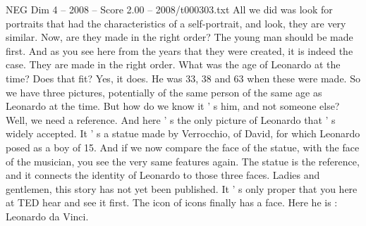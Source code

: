 \begin{textsample}{NEG Dim 4 – 2008 – Score 2.00 – 2008/t000303.txt}
All we did was look for portraits that had the characteristics of a self-portrait, and look, they are very similar.
Now, are they made in the right order?
The young man should be made first.
And as you see here from the years that they were created, it is indeed the case.
They are made in the right order.
What was the age of Leonardo at the time?
Does that fit?
Yes, it does.
He was 33, 38 and 63 when these were made.
So we have three pictures, potentially of the same person of the same age as Leonardo at the time.
But how do we know it ' s him, and not someone else?
Well, we need a reference.
And here ' s the only picture of Leonardo that ' s widely accepted.
It ' s a statue made by Verrocchio, of David, for which Leonardo posed as a boy of 15.
And if we now compare the face of the statue, with the face of the musician, you see the very same features again.
The statue is the reference, and it connects the identity of Leonardo to those three faces.
Ladies and gentlemen, this story has not yet been published.
It ' s only proper that you here at TED hear and see it first.
The icon of icons finally has a face.
Here he is : Leonardo da Vinci.

\end{textsample}
